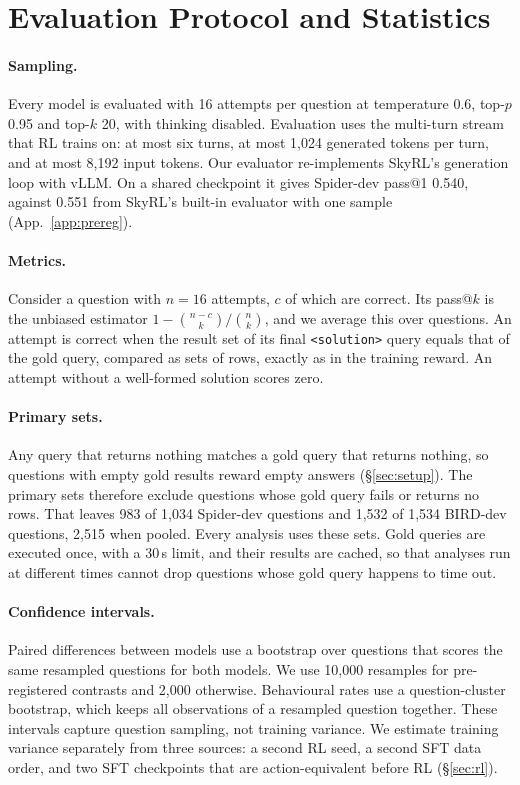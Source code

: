\section{Evaluation Protocol and Statistics}
\label{app:eval}

\paragraph{Sampling.}
Every model is evaluated with 16 attempts per question at temperature 0.6, top-$p$ 0.95 and top-$k$ 20, with thinking disabled. Evaluation uses the multi-turn stream that RL trains on: at most six turns, at most 1,024 generated tokens per turn, and at most 8,192 input tokens. Our evaluator re-implements SkyRL's generation loop with vLLM. On a shared checkpoint it gives Spider-dev pass@1 0.540, against 0.551 from SkyRL's built-in evaluator with one sample (App.~\ref{app:prereg}).

\paragraph{Metrics.}
Consider a question with $n=16$ attempts, $c$ of which are correct. Its pass@$k$ is the unbiased estimator $1-\binom{n-c}{k}/\binom{n}{k}$, and we average this over questions. An attempt is correct when the result set of its final \texttt{<solution>} query equals that of the gold query, compared as sets of rows, exactly as in the training reward. An attempt without a well-formed solution scores zero.

\paragraph{Primary sets.}
Any query that returns nothing matches a gold query that returns nothing, so questions with empty gold results reward empty answers (\S\ref{sec:setup}). The primary sets therefore exclude questions whose gold query fails or returns no rows. That leaves 983 of 1,034 Spider-dev questions and 1,532 of 1,534 BIRD-dev questions, 2,515 when pooled. Every analysis uses these sets. Gold queries are executed once, with a 30\,s limit, and their results are cached, so that analyses run at different times cannot drop questions whose gold query happens to time out.

\paragraph{Confidence intervals.}
Paired differences between models use a bootstrap over questions that scores the same resampled questions for both models. We use 10,000 resamples for pre-registered contrasts and 2,000 otherwise. Behavioural rates use a question-cluster bootstrap, which keeps all observations of a resampled question together. These intervals capture question sampling, not training variance. We estimate training variance separately from three sources: a second RL seed, a second SFT data order, and two SFT checkpoints that are action-equivalent before RL (\S\ref{sec:rl}).

